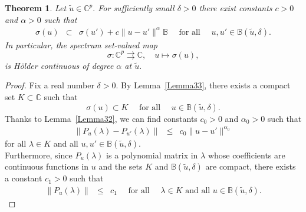 \documentclass[10pt,reqno]{amsart}
\theoremstyle{break-italic}
\theoremstyle{break-italic}
\theoremstyle{break-italic}
\theoremstyle{break-italic}
\theoremstyle{break-italic}
\theoremstyle{break-italic}
\theoremstyle{break-italic}
\theoremstyle{break-italic}
\newtheorem{theorem}[satz]{Theorem}
\theoremstyle{break-roman}
\theoremstyle{standard}
\theoremstyle{varthm-roman}
\theoremstyle{varthm-italic}
\theoremstyle{varthm-roman-break}
\theoremstyle{varthm-italic-break}
\theoremstyle{varthm-roman-no-punctuation}
\theoremstyle{varthm-italic-no-punctuation}
\numberwithin{equation}{section}
\begin{document}
\begin{theorem}\label{Theorem32}
Let $\tilde{u} \in \mathbb{C}^p.$ For sufficiently small $\delta > 0$ there exist constants $c > 0$ and $\alpha > 0$ such that
\begin{eqnarray*}
\sigma(u) &\subset& \sigma(u') + c \|u - u'\|^\alpha \mathbb{B} \quad \textrm{ for all } \quad u, u' \in \mathbb{B}(\tilde{u}, \delta).
\end{eqnarray*}
In particular, the spectrum set-valued map
$$\sigma \colon \mathbb{C}^p \rightrightarrows \mathbb{C}, \quad u \mapsto \sigma(u),$$
is H\"older continuous of degree $\alpha$ at $\tilde{u}.$
\end{theorem}

\begin{proof}
Fix a real number $\delta > 0.$ By Lemma~\ref{Lemma33}, there exists a compact set $K \subset \mathbb{C}$ such that
$$\sigma(u) \subset K \quad \textrm{ for all } \quad u \in \mathbb{B}(\tilde{u}, \delta).$$
Thanks to Lemma~\ref{Lemma32}, we can find constants $c_0 > 0$ and $\alpha_0 > 0$ such that
\begin{eqnarray} \label{inequality1}
\| P_{u}(\lambda) - P_{u'}(\lambda) \| & \le & c_0 \|u - u'\|^{\alpha_0} 
\end{eqnarray}
for all $ \lambda \in K $  and all  $ u, u' \in \mathbb{B}(\tilde{u},\delta)$.\\
Furthermore, since $P_u(\lambda)$ is a polynomial matrix in $\lambda$ whose coefficients are continuous functions in $u$ and the sets $K$ and $\mathbb{B}(\tilde{u}, \delta)$ are compact, there exists a constant $c_1 > 0$ such that
\begin{eqnarray} \label{inequality2}
\| P_{u}(\lambda) \| & \le & c_1 \quad \textrm{ for all } \quad \lambda \in K \textrm{ and all } u \in \mathbb{B}(\tilde{u}, \delta).
\end{eqnarray}


\end{proof}
\end{document}
